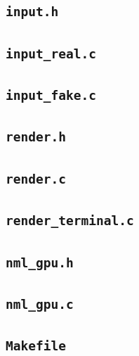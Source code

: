 \documentclass[11pt,letterpaper]{article}
\begin{document}
\subsection*{\texttt{input.h}}


\subsection*{\texttt{input\_real.c}}


\subsection*{\texttt{input\_fake.c}}


\subsection*{\texttt{render.h}}


\subsection*{\texttt{render.c}}


\subsection*{\texttt{render\_terminal.c}}


\subsection*{\texttt{nml\_gpu.h}}


\subsection*{\texttt{nml\_gpu.c}}


\subsection*{\texttt{Makefile}}

\end{document}
